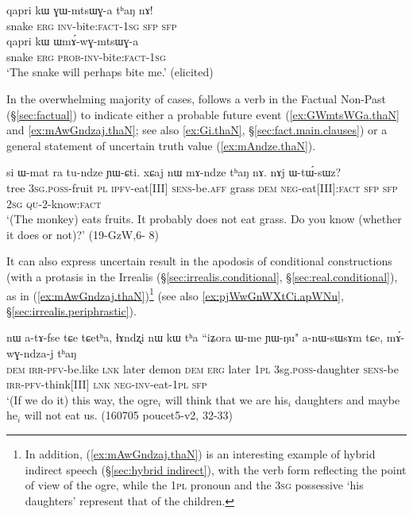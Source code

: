 \begin{exe}
\ex 
\begin{xlist}
 \ex \label{ex:GWmtsWGa.thaN}
\gll qapri kɯ ɣɯ-mtsɯɣ-a tʰaŋ nɤ! \\
 snake \textsc{erg} \textsc{inv}-bite:\textsc{fact}-\textsc{1sg} \textsc{sfp} \textsc{sfp} \\
 \ex \label{ex:WmAwGmtsWGa}
\gll  qapri kɯ ɯmɤ́-wɣ-mtsɯɣ-a \\
 snake \textsc{erg} \textsc{prob}-\textsc{inv}-bite:\textsc{fact}-\textsc{1sg} \\
 \glt `The snake will perhaps bite me.' (elicited)
 \end{xlist}
 \end{exe} 

In the overwhelming majority of cases,  follows a verb in the Factual Non-Past (§\ref{sec:factual}) to indicate either a probable future event (\ref{ex:GWmtsWGa.thaN} and \ref{ex:mAwGndzaj.thaN}; see also \ref{ex:Gi.thaN}, §\ref{sec:fact.main.clauses}) or a general statement of uncertain truth value (\ref{ex:mAndze.thaN}).

\begin{exe}
\ex \label{ex:mAndze.thaN}
\gll si ɯ-mat ra tu-ndze ɲɯ-ɕti.  xɕaj nɯ mɤ-ndze tʰaŋ nɤ. nɤj ɯ-tɯ́-sɯz? \\
 tree \textsc{3sg}.\textsc{poss}-fruit \textsc{pl} \textsc{ipfv}-eat[III] \textsc{sens}-be.\textsc{aff} grass \textsc{dem} \textsc{neg}-eat[III]:\textsc{fact} \textsc{sfp} \textsc{sfp}  \textsc{2sg} \textsc{qu}-2-know:\textsc{fact} \\
 \glt `(The monkey) eats fruits. It probably does not eat grass. Do you know (whether it does or not)?' (19-GzW,6- 8)
\end{exe} 
 
It can also express uncertain result in the apodosis of conditional constructions (with a protasis in the Irrealis (§\ref{sec:irrealis.conditional}, §\ref{sec:real.conditional}), as in (\ref{ex:mAwGndzaj.thaN})\footnote{In addition, (\ref{ex:mAwGndzaj.thaN}) is an interesting example of hybrid indirect speech (§\ref{sec:hybrid indirect}), with the verb form  reflecting the point of view of the ogre, while the \textsc{1pl} pronoun  and the \textsc{3sg} possessive   `his daughters' represent that of the children. } (see also \ref{ex:pjWwGnWXtCi.apWNu}, §\ref{sec:irrealis.periphrastic}).

\begin{exe}
\ex \label{ex:mAwGndzaj.thaN}
\gll  nɯ a-tɤ-fse tɕe tɕetʰa,  ɬɤndʐi nɯ kɯ tʰa ``iʑora ɯ-me ɲɯ-ŋu" a-nɯ-sɯsɤm tɕe, mɤ́-wɣ-ndza-j tʰaŋ \\
\textsc{dem} \textsc{irr}-\textsc{pfv}-be.like \textsc{lnk} later demon \textsc{dem} \textsc{erg} later \textsc{1pl} 3sg.\textsc{poss}-daughter \textsc{sens}-be \textsc{irr}-\textsc{pfv}-think[III] \textsc{lnk} \textsc{neg}-\textsc{inv}-eat-\textsc{1pl} \textsc{sfp} \\
\glt `(If we do it) this way, the ogre$_i$ will think that we are his$_i$ daughters and maybe he$_i$ will not eat us. (160705 poucet5-v2, 32-33)
\end{exe} 

